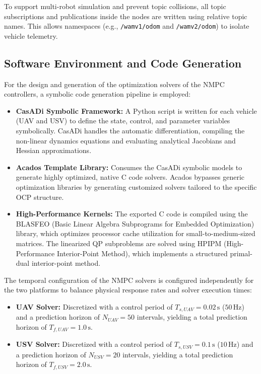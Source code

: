     To support multi-robot simulation and prevent topic collisions, all topic subscriptions and publications inside the nodes are written using relative topic names. This allows namespaces (e.g., \texttt{/wamv1/odom} and \texttt{/wamv2/odom}) to isolate vehicle telemetry.

    \subsection{Software Environment and Code Generation}
    \label{sec:sim_software_stack}
    For the design and generation of the optimization solvers of the NMPC controllers, a symbolic code generation pipeline is employed:
    \begin{itemize}
        \item \textbf{CasADi Symbolic Framework:} A Python script is written for each vehicle (UAV and USV) to define the state, control, and parameter variables symbolically. CasADi handles the automatic differentiation, compiling the non-linear dynamics equations and evaluating analytical Jacobians and Hessian approximations.
        \item \textbf{Acados Template Library:} Consumes the CasADi symbolic models to generate highly optimized, native C code solvers. Acados bypasses generic optimization libraries by generating customized solvers tailored to the specific OCP structure.
        \item \textbf{High-Performance Kernels:} The exported C code is compiled using the BLASFEO (Basic Linear Algebra Subprograms for Embedded Optimization) library, which optimizes processor cache utilization for small-to-medium-sized matrices. The linearized QP subproblems are solved using HPIPM (High-Performance Interior-Point Method), which implements a structured primal-dual interior-point method.
    \end{itemize}

    The temporal configuration of the NMPC solvers is configured independently for the two platforms to balance physical response rates and solver execution times:
    \begin{itemize}
        \item \textbf{UAV Solver:} Discretized with a control period of $T_{s,UAV} = 0.02\,\text{s}$ ($50\,\text{Hz}$) and a prediction horizon of $N_{UAV} = 50$ intervals, yielding a total prediction horizon of $T_{f,UAV} = 1.0\,\text{s}$.
        \item \textbf{USV Solver:} Discretized with a control period of $T_{s,USV} = 0.1\,\text{s}$ ($10\,\text{Hz}$) and a prediction horizon of $N_{USV} = 20$ intervals, yielding a total prediction horizon of $T_{f,USV} = 2.0\,\text{s}$.
    \end{itemize}

